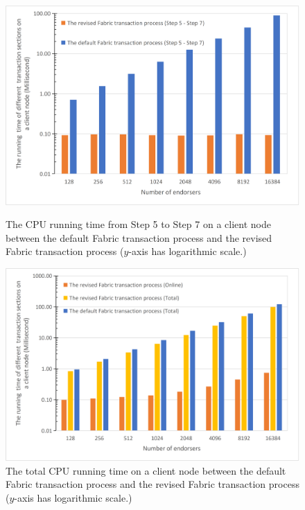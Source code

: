 \documentclass[journal]{IEEEtran}
\begin{document}
\begin{figure}
\begin{minipage}[t]{0.45\linewidth}
\centering
\includegraphics[width=\textwidth]{Fig10.jpg}
\caption{The CPU running time from Step 5 to Step 7 on a client node between the default Fabric transaction process and the revised Fabric transaction process ($y$-axis has logarithmic scale.)} \label{figHY3}
\end{minipage}
\hfill
\begin{minipage}[t]{0.45\linewidth}
\centering
\includegraphics[width=\textwidth]{Fig11.jpg}
\caption{The total CPU running time on a client node between the default Fabric transaction process and the revised Fabric transaction process ($y$-axis has logarithmic scale.)} \label{figHY4}
\end{minipage}
\end{figure}
\end{document}
